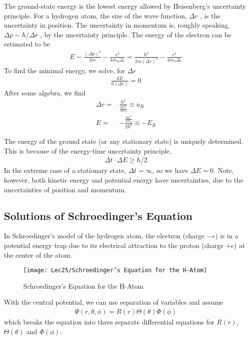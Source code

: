 The ground-state energy is the lowest energy allowed by Heisenberg’s uncertainty principle. For a hydrogen atom, the size of the wave function, $\Delta r$ , is the uncertainty in position. The uncertainty in momentum is, roughly speaking, $\Delta p \sim \hbar/\Delta r$ , by the uncertainty principle. The energy of the electron can be estimated to be
\begin{align*}
    E\sim\frac{(\Delta p)^2}{2m}-\frac{e^2}{4\pi\epsilon_0 \Delta_r}=\frac{\hbar^2}{2m(\Delta r)^2}-\frac{e^2}{4\pi\epsilon_0 \Delta_r}
\end{align*}
To find the minimal energy, we solve, for $\Delta r$
\begin{align*}
    \frac{\mathrm{d}E}{\mathrm{d}(\Delta r)}=0
\end{align*}
After some algebra, we find
\begin{align*}
    \Delta r=&\frac{\hbar^2}{\frac{me^2}{4\pi\epsilon_0}}\equiv a_B\\
    E=&-\frac{\frac{me^2}{4\pi\epsilon_0}}{2\hbar^2}\equiv -E_R
\end{align*}

The energy of the ground state (or any stationary state) is uniquely determined. This is because of the energy-time uncertainty principle,
\begin{align*}
    \Delta t \cdot \Delta E \ge \hbar/2
\end{align*}
In the extreme case of a stationary state, $\Delta t=\infty$, so we have $\Delta E=0$. Note, however, both kinetic energy and potential energy have uncertainties, due to the uncertainties of position and momentum. 

\subsection{Solutions of Schroedinger’s Equation}
In Schroedinger's model of the hydrogen atom, the electron (charge $-e$) is in a potential energy trap due to its electrical attraction to the proton (charge $+e$) at the center of the atom. 

\begin{figure}[H]
    \centering
    \texttt{[image: Lec25/Schroedinger’s Equation for the H-Atom]}
    \caption{Schroedinger’s Equation for the H-Atom}
\end{figure}

With the central potential, we can use separation of variables and assume 
\begin{align*}
    \Psi(r,\theta,\phi)=R(r)\Theta(\theta)\Phi(\phi) 
\end{align*}
which breaks the equation into three separate differential equations for $R(r)$, $\Theta(\theta)$ and $\Phi(\phi)$.  

